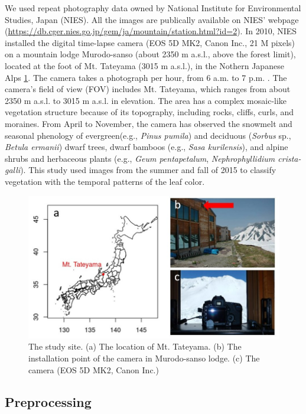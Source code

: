 \documentclass{article}
\begin{document}
We used repeat photography data owned by National Institute for Environmental Studies, Japan (NIES). All the images are publically available on NIES' webpage (\url{https://db.cger.nies.go.jp/gem/ja/mountain/station.html?id=2}). In 2010, NIES installed the digital time-lapse camera (EOS 5D MK2, Canon Inc., 21 M pixels) on a mountain lodge Murodo-sanso (about 2350 m a.s.l., above the forest limit), located at the foot of Mt. Tateyama (3015 m a.s.l.), in the Nothern Japanese Alps \ref{fig:map}. The camera takes a photograph per hour, from 6 a.m. to 7 p.m. . The camera's field of view (FOV) includes Mt. Tateyama, which ranges from about 2350 m a.s.l. to 3015 m a.s.l. in elevation. The area has a complex mosaic-like vegetation structure because of its topography, including rocks, cliffs, curls, and moraines. From April to November, the camera has observed the snowmelt and seasonal phenology of evergreen(e.g., \emph{Pinus pumila}) and deciduous (\emph{Sorbus} sp., \emph{Betula ermanii}) dwarf trees, dwarf bamboos (e.g., \emph{Sasa kurilensis}), and alpine shrubs and herbaceous plants (e.g., \emph{Geum pentapetalum}, \emph{Nephrophyllidium crista-galli}). This study used images from the summer and fall of 2015 to classify vegetation with the temporal patterns of the leaf color.



\begin{figure}
\includegraphics[width=1\linewidth]{paper_files/figures/Slide3} \caption{The study site. (a) The location of Mt. Tateyama. (b) The installation point of the camera in Murodo-sanso lodge. (c) The camera (EOS 5D MK2, Canon Inc.)}\label{fig:map}
\end{figure}

\hypertarget{preprocessing}{%
\subsection{Preprocessing}\label{preprocessing}}
\end{document}
